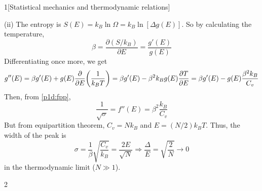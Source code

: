 \documentclass[12pt]{article}
\begin{document}
\begin{problem}{1}[Statistical mechanics and thermodynamic relations]
\begin{solution}
(ii) The entropy is $S(E)=k_B\ln\Omega=k_B\ln[\Delta g(E)]$. So by calculating
the temperature,
\begin{equation}
    \beta=\frac{\partial(S/k_B)}{\partial E} 
    =\frac{g'(E)}{g(E)}
\end{equation}
Differentiating once more, we get
\begin{equation}
    g''(E)=\beta g'(E)+g(E)\frac{\partial}{\partial E}\qty(\frac1{k_BT})
    =\beta g'(E)-\beta^2k_Bg(E)\frac{\partial T}{\partial E}
    =\beta g'(E)-g(E)\frac{\beta^2k_B}{C_v}
\end{equation}
Then, from \eqref{p1d:fpp},
\begin{equation}
    \frac1{\sqrt\sigma}=f''(E)=\beta^2\frac{k_B}{C_v}
\end{equation}
But from equipartition theorem, $C_v=Nk_B$ and $E=(N/2)k_BT$. Thus, the width of
the peak is
\begin{equation}
    \sigma=\frac1\beta\sqrt{\frac{C_v}{k_B}}=\frac{2E}{\sqrt{N}}\Rightarrow
    \frac{\Delta}{E}=\sqrt{\frac2N}\to 0
\end{equation}
in the thermodynamic limit ($N\gg 1$).
\end{solution}
\newpage
\end{problem}
\begin{problem}{2}
\begin{solution}
\end{solution}
\end{problem}
    
\end{document}
